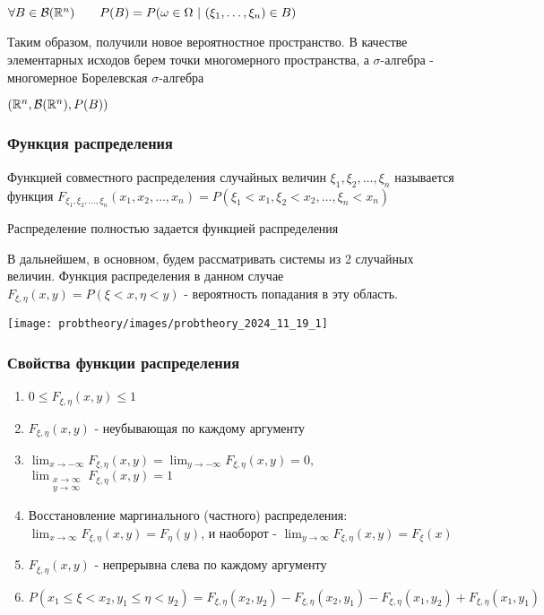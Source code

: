 \documentclass[12pt]{article}
\begin{document}
    $\forall B \in \mathcal{B}(\mathbb{R}^n) \qquad P(B) = P(\omega \in \Omega \ | \ (\xi_1, \dots, \xi_n) \in B)$

    Таким образом, получили новое вероятностное пространство. В качестве элементарных исходов берем точки многомерного пространства, 
    а $\sigma$-алгебра - многомерное Борелевская $\sigma$-алгебра

    $(\mathbb{R}^n, \mathcal{B}(\mathbb{R}^n), P(B))$

    \subsubsection{Функция распределения}

        
    \Def Функцией совместного распределения случайных величин $\xi_1, \xi_2, \dots, \xi_n$ называется функция 
    $F_{\xi_1, \xi_2, \dots, \xi_n}(x_1, x_2, \dots, x_n) = P(\xi_1 < x_1, \xi_2 < x_2, \dots, \xi_n < x_n)$

    \Notas Распределение полностью задается функцией распределения

    \Nota В дальнейшем, в основном, будем рассматривать системы из 2 случайных величин. Функция распределения в данном случае $F_{\xi, \eta}(x, y) = P(\xi < x, \eta < y)$ - вероятность попадания в эту область.

    \begin{center}
        \texttt{[image: probtheory/images/probtheory\_2024\_11\_19\_1]}
    \end{center}


    \subsubsection{Свойства функции распределения}

    \begin{enumerate}
        \item $0 \leq F_{\xi, \eta}(x, y) \leq 1$
        \item $F_{\xi, \eta}(x, y)$ - неубывающая по каждому аргументу
        \item $\lim_{x \to -\infty} F_{\xi, \eta}(x, y) = \lim_{y \to -\infty} F_{\xi, \eta}(x, y) = 0, $
        $\lim_{\substack{x \to \infty \\ y \to \infty}} F_{\xi, \eta}(x, y) = 1$

        \item Восстановление маргинального (частного) распределения: 
        $\lim_{x \to \infty} F_{\xi, \eta}(x, y) = F_\eta(y)$, и наоборот - $\lim_{y \to \infty} F_{\xi, \eta}(x, y) = F_\xi(x)$

        \item $F_{\xi, \eta}(x, y)$ - непрерывна слева по каждому аргументу

        \item $P(x_1 \leq \xi < x_2, y_1 \leq \eta < y_2) = F_{\xi, \eta}(x_2, y_2) - F_{\xi, \eta}(x_2, y_1) - F_{\xi, \eta}(x_1, y_2) + F_{\xi, \eta}(x_1, y_1)$
    \end{enumerate}
\end{document}
